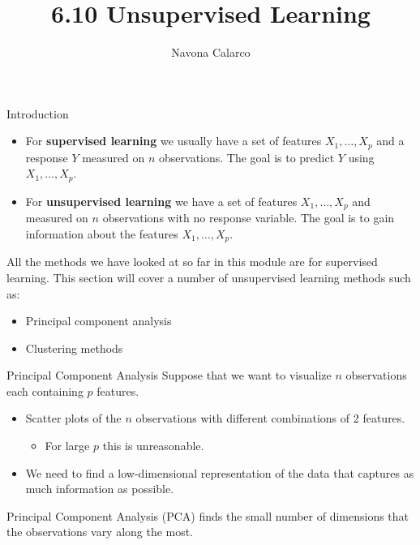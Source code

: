 \documentclass[
  ignorenonframetext,
  aspectratio=169,
]{beamer}
\title{6.10 Unsupervised Learning}
\author{Navona Calarco}
\date{}
\institute{The University of Toronto}
\providecommand{\tightlist}{%
  \setlength{\itemsep}{0pt}\setlength{\parskip}{0pt}}\usepackage{longtable,booktabs,array}
\begin{document}
\frame{\titlepage}
\ifdefined\Shaded\renewenvironment{Shaded}{\begin{tcolorbox}[borderline west={3pt}{0pt}{shadecolor}, enhanced, boxrule=0pt, breakable, interior hidden, frame hidden, sharp corners]}{\end{tcolorbox}}\fi

\begin{frame}{Introduction}
\protect\hypertarget{introduction}{}
\begin{itemize}
\item
  For \textbf{supervised learning} we usually have a set of features
  \(X_1, \dots, X_p\) and a response \(Y\) measured on \(n\)
  observations. The goal is to
  \alert{predict $Y$ using $X_1, \dots, X_p$}.
\item
  For \textbf{unsupervised learning} we have a set of features
  \(X_1, \dots, X_p\) and measured on \(n\) observations with no
  response variable. The goal is to
  \alert{gain information about the features $X_1, \dots, X_p$}.
\end{itemize}

All the methods we have looked at so far in this module are for
supervised learning. This section will cover a number of unsupervised
learning methods such as:

\begin{itemize}
\item
  Principal component analysis
\item
  Clustering methods
\end{itemize}
\end{frame}

\begin{frame}{Principal Component Analysis}
\protect\hypertarget{principal-component-analysis}{}
Suppose that we want to visualize \(n\) observations each containing
\(p\) features.

\begin{itemize}
\item
  Scatter plots of the \(n\) observations with different combinations of
  2 features.

  \begin{itemize}
  \tightlist
  \item
    For large \(p\) this is unreasonable.
  \end{itemize}
\item
  We need to find a low-dimensional representation of the data that
  captures as much information as possible.
\end{itemize}

\alert{Principal Component Analysis (PCA) finds the small number of dimensions that the observations vary along the most.}
\end{frame}
\end{document}
